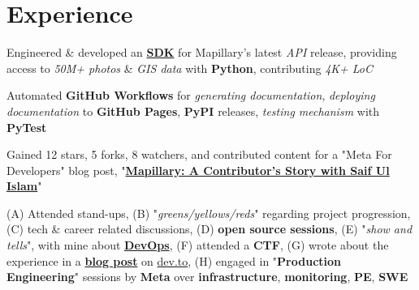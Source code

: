 \documentclass[]{deedy-resume-openfont}
\begin{document}
\hfill
\begin{minipage}[t]{0.65\textwidth} 


\section{Experience}
\vspace{\topsep}
\begin{tightemize}
    \item Engineered \& developed an \textbf{\href{https://github.com/facebookincubator/mapillary-python-sdk}{SDK}} for Mapillary's latest \textit{API} release, providing access to \textit{50M+ photos} \& \textit{GIS data} with \textbf{Python}, contributing \textit{4K+ LoC}

    \item Automated \textbf{GitHub Workflows} for \textit{generating documentation}, \textit{deploying documentation} to \textbf{GitHub Pages}, \textbf{PyPI} releases, \textit{testing mechanism} with \textbf{PyTest}

    \item Gained 12 stars, 5 forks, 8 watchers, and contributed content for a "Meta For Developers" blog post, "\href{https://developers.facebook.com/blog/post/2022/01/04/mapillary-contributor-story-saif-ul-islam/}{\textbf{Mapillary: A Contributor’s Story with Saif Ul Islam}}"
\end{tightemize}
\sectionsep

\begin{tightemize}
    \item (A) Attended stand-ups, (B) "\textit{greens/yellows/reds}" regarding project progression, (C) tech \& career related discussions, (D) \textbf{open source sessions}, (E) "\textit{show and tells}", with mine about \textbf{\href{https://docs.google.com/presentation/d/1HK-APNPhx1so6GklqtKuFHwMSWU67delCjWtVDOA3MA/edit?usp=sharing}{DevOps}}, (F) attended a \textbf{CTF}, (G) wrote about the experience in a \href{https://dev.to/rubix982/mlh-open-source-mapillary-me-nji}{\textbf{blog post}} on \href{https://dev.to/}{dev.to}, (H) engaged in "\textbf{Production Engineering}" sessions by \textbf{Meta} over \textbf{infrastructure}, \textbf{monitoring}, \textbf{PE}, \textbf{SWE}
    

\end{tightemize}
\end{minipage}
\end{document}
